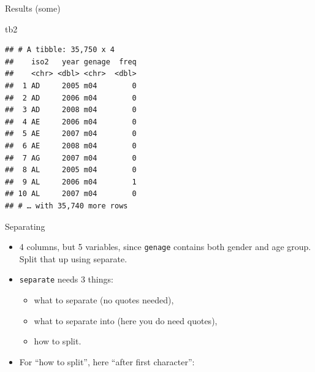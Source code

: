 \documentclass[ignorenonframetext,]{beamer}
\newenvironment{Shaded}{\begin{snugshade}}{\end{snugshade}}
\newcommand{\DecValTok}[1]{\textcolor[rgb]{0.00,0.00,0.81}{#1}}
\newcommand{\KeywordTok}[1]{\textcolor[rgb]{0.13,0.29,0.53}{\textbf{#1}}}
\newcommand{\NormalTok}[1]{#1}
\newcommand{\OperatorTok}[1]{\textcolor[rgb]{0.81,0.36,0.00}{\textbf{#1}}}
\newcommand{\StringTok}[1]{\textcolor[rgb]{0.31,0.60,0.02}{#1}}
\providecommand{\tightlist}{%
  \setlength{\itemsep}{0pt}\setlength{\parskip}{0pt}}
\begin{document}
\begin{frame}[fragile]{Results (some)}
\protect\hypertarget{results-some}{}

\begin{Shaded}
\begin{Highlighting}[]
\NormalTok{tb2}
\end{Highlighting}
\end{Shaded}

\begin{verbatim}
## # A tibble: 35,750 x 4
##    iso2   year genage  freq
##    <chr> <dbl> <chr>  <dbl>
##  1 AD     2005 m04        0
##  2 AD     2006 m04        0
##  3 AD     2008 m04        0
##  4 AE     2006 m04        0
##  5 AE     2007 m04        0
##  6 AE     2008 m04        0
##  7 AG     2007 m04        0
##  8 AL     2005 m04        0
##  9 AL     2006 m04        1
## 10 AL     2007 m04        0
## # … with 35,740 more rows
\end{verbatim}

\end{frame}

\begin{frame}[fragile]{Separating}
\protect\hypertarget{separating}{}

\begin{itemize}
\tightlist
\item
  4 columns, but 5 variables, since \texttt{genage} contains both gender
  and age group. Split that up using separate.
\item
  \texttt{separate} needs 3 things:

  \begin{itemize}
  \tightlist
  \item
    what to separate (no quotes needed),
  \item
    what to separate into (here you do need quotes),
  \item
    how to split.
  \end{itemize}
\item
  For ``how to split'', here ``after first character'':
\end{itemize}

\begin{Shaded}
\end{Shaded}

\end{frame}
\end{document}
